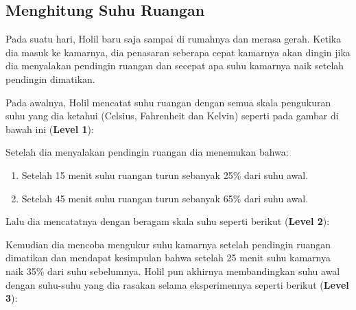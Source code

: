 \documentclass[../main.tex]{subfiles}
\begin{document}
    \subsection{Menghitung Suhu Ruangan}

    Pada suatu hari, Holil baru saja sampai di rumahnya dan merasa gerah. Ketika dia masuk ke kamarnya, dia penasaran seberapa cepat kamarnya akan dingin jika dia menyalakan pendingin ruangan dan secepat apa suhu kamarnya naik setelah pendingin dimatikan.

    Pada awalnya, Holil mencatat suhu ruangan dengan semua skala pengukuran suhu yang dia ketahui (Celsius, Fahrenheit dan Kelvin) seperti pada gambar di bawah ini (\textbf{Level 1}):


    Setelah dia menyalakan pendingin ruangan dia menemukan bahwa:
    \begin{enumerate}[leftmargin=1.8cm]
        \item Setelah 15 menit suhu ruangan turun sebanyak 25\% dari suhu awal.
        \item Setelah 45 menit suhu ruangan turun sebanyak 65\% dari suhu awal.
    \end{enumerate}

     Lalu dia mencatatnya dengan beragam skala suhu seperti berikut (\textbf{Level 2}):

    Kemudian dia mencoba mengukur suhu kamarnya setelah pendingin ruangan dimatikan dan mendapat kesimpulan bahwa setelah 25 menit suhu kamarnya naik 35\% dari suhu sebelumnya. Holil pun akhirnya membandingkan suhu awal dengan suhu-suhu yang dia rasakan selama eksperimennya seperti berikut (\textbf{Level 3}):
\end{document}
